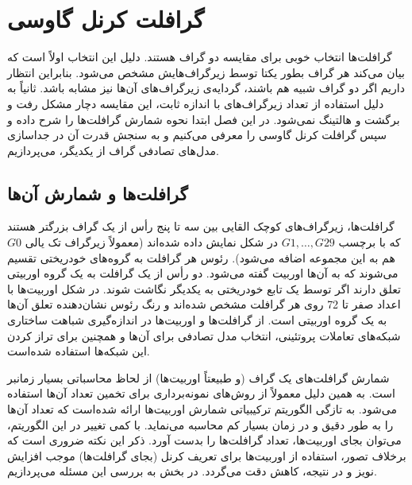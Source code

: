 \chapter{گرافلت کرنل گاوسی}\label{chap:gaussian-graphlet-kernel}
گرافلت‌ها انتخاب خوبی برای مقایسه دو گراف هستند. دلیل این انتخاب اولاً  است که بیان می‌کند هر گراف بطور یکتا توسط زیرگراف‌هایش مشخص می‌شود. بنابراین انتظار داریم اگر دو گراف شبیه هم باشند، گردایه‌ی زیرگراف‌های آن‌ها نیز مشابه باشد. ثانیاً به دلیل استفاده از تعداد زیرگراف‌های با اندازه ثابت، این مقایسه دچار مشکل رفت و برگشت و هالتینگ نمی‌شود.
در این فصل ابتدا نحوه شمارش گرافلت‌ها را شرح داده و سپس گرافلت کرنل گاوسی را معرفی می‌کنیم و به سنجش قدرت آن در جداسازی مدل‌های تصادفی گراف از یکدیگر، می‌پردازیم.

\section{گرافلت‌ها و شمارش آن‌ها}
گرافلت‌ها، زیرگراف‌های کوچک القایی بین سه تا پنج رأس از یک گراف بزرگتر هستند که با برچسب $G1,\ldots,G29$ در شکل  نمایش داده شده‌اند (معمولاً زیرگراف تک یالی $G0$ هم به این مجموعه اضافه می‌شود).  رئوس هر گرافلت به گروه‌های خودریختی تقسیم می‌شوند که به آن‌ها اوربیت گفته می‌شود. دو رأس از یک گرافلت به یک گروه اوربیتی تعلق دارند اگر توسط یک تابع خودریختی به یکدیگر نگاشت شوند. در شکل  اوربیت‌ها با اعداد صفر تا 72 روی هر گرافلت مشخص شده‌اند و رنگ رئوس نشان‌دهنده تعلق آن‌ها به یک گروه اوربیتی است. از گرافلت‌ها و اوربیت‌ها در اندازه‌گیری شباهت ساختاری شبکه‌های تعاملات پروتئینی، انتخاب مدل تصادفی برای آن‌ها و همچنین برای تراز کردن این شبکه‌ها استفاده شده‌است.

شمارش گرافلت‌های یک گراف (و طبیعتاً اوربیت‌ها) از لحاظ محاسباتی بسیار زمانبر است. به همین دلیل معمولاً از روش‌های نمونه‌برداری برای تخمین تعداد آن‌ها استفاده می‌شود. به تازگی الگوریتم ترکیبیاتی شمارش اوربیت‌ها ارائه شده‌است که تعداد آن‌ها را به طور دقیق و در زمان بسیار کم محاسبه می‌نماید. با کمی تغییر در این الگوریتم، می‌توان بجای اوربیت‌ها، تعداد گرافلت‌ها را بدست آورد. ذکر این نکته ضروری است که برخلاف تصور، استفاده از اوربیت‌ها برای تعریف کرنل (بجای گرافلت‌ها) موجب افزایش نویز و در نتیجه، کاهش دقت می‌گردد. در بخش  به بررسی این مسئله می‌پردازیم.


